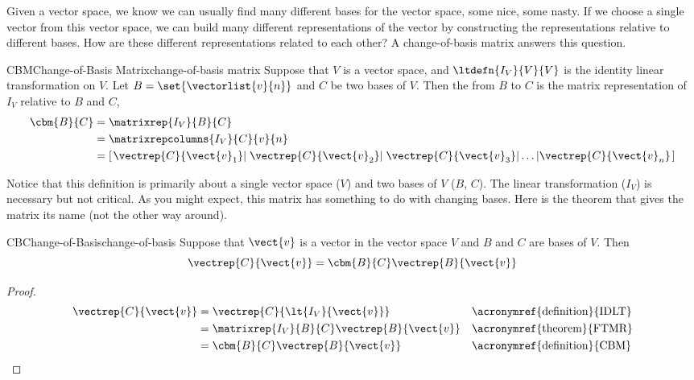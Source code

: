 %
%
Given a vector space, we know we can usually find many different bases for the vector space, some nice, some nasty.  If we choose a single vector from this vector space, we can build many different representations of the vector by constructing the representations relative to different bases.  How are these different representations related to each other?  A change-of-basis matrix answers this question.
%
\begin{definition}{CBM}{Change-of-Basis Matrix}{change-of-basis matrix}
Suppose that $V$ is a vector space, and $\ltdefn{I_V}{V}{V}$ is the identity linear transformation on $V$.  Let $B=\set{\vectorlist{v}{n}}$ and $C$ be two bases of $V$.  Then the  from $B$ to $C$ is the matrix representation of $I_V$ relative to $B$ and $C$,
%
\begin{align*}
\cbm{B}{C}&=\matrixrep{I_V}{B}{C}\\
&=\matrixrepcolumns{I_V}{C}{v}{n}\\
&=\left\lbrack
\left.\vectrep{C}{\vect{v}_1}\right|
\left.\vectrep{C}{\vect{v}_2}\right|
\left.\vectrep{C}{\vect{v}_3}\right|
\ldots
\left|\vectrep{C}{\vect{v}_n}\right.
\right\rbrack
\end{align*}
%
\end{definition}
%
Notice that this definition is primarily about a single vector space ($V$) and two bases of $V$ ($B$, $C$).  The linear transformation ($I_V$) is necessary but not critical.  As you might expect, this matrix has something to do with changing bases.  Here is the theorem that gives the matrix its name (not the other way around).
%
\begin{theorem}{CB}{Change-of-Basis}{change-of-basis}
Suppose that $\vect{v}$ is a vector in the vector space $V$ and $B$ and $C$ are bases of $V$.  Then
%
\begin{equation*}
\vectrep{C}{\vect{v}}=\cbm{B}{C}\vectrep{B}{\vect{v}}
\end{equation*}
%
\end{theorem}
%
\begin{proof}
%
\begin{align*}
\vectrep{C}{\vect{v}}
&=\vectrep{C}{\lt{I_V}{\vect{v}}}
&&\text{\acronymref{definition}{IDLT}}\\
%
&=\matrixrep{I_V}{B}{C}\vectrep{B}{\vect{v}}
&&\text{\acronymref{theorem}{FTMR}}\\
%
&=\cbm{B}{C}\vectrep{B}{\vect{v}}
&&\text{\acronymref{definition}{CBM}}
%
\end{align*}
%
\end{proof}
